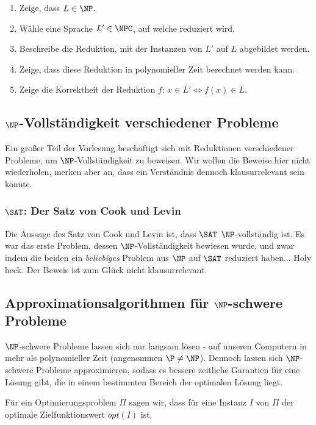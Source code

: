 \documentclass[a4paper,parskip=half*,DIV=7,fontsize=11pt]{scrartcl}
\begin{document}
\begin{enumerate}
\item Zeige, dass $L \in \NP$.
\item Wähle eine Sprache $L' \in \NPC$, auf welche reduziert wird.
\item Beschreibe die Reduktion, mit der Instanzen von $L'$ auf $L$ abgebildet werden.
\item Zeige, dass diese Reduktion in polynomieller Zeit berechnet werden kann.
\item Zeige die Korrektheit der Reduktion $f$: $x \in L' \iff f(x) \in L$.
\end{enumerate}

\subsection[NP-Vollständigkeit verschiedener Probleme]{$\NP$-Vollständigkeit verschiedener Probleme}

Ein großer Teil der Vorlesung beschäftigt sich mit Reduktionen verschiedener Probleme, um $\NP$-Vollständigkeit zu beweisen. Wir wollen die Beweise hier nicht wiederholen, merken aber an, dass ein Verständnis dennoch klausurrelevant sein könnte.

\subsubsection[SAT: Der Satz von Cook und Levin]{$\SAT$: Der Satz von Cook und Levin}
Die Aussage des Satz von Cook und Levin ist, dass $\SAT$ $\NP$-vollständig ist. Es war das erste Problem, dessen $\NP$-Vollständigkeit bewiesen wurde, und zwar indem die beiden ein \textit{beliebiges} Problem aus $\NP$ auf $\SAT$ reduziert haben... Holy heck. Der Beweis ist zum Glück nicht klausurrelevant.

\subsection[Approximationsalgorithmen für NP-schwere Probleme]{Approximationsalgorithmen für $\NP$-schwere Probleme}
$\NP$-schwere Probleme lassen sich nur langsam lösen - auf unseren Computern in mehr als polynomieller Zeit (angenommen $\P \neq \NP$). Dennoch lassen sich $\NP$-schwere Probleme approximieren, sodass es bessere zeitliche Garantien für eine Lösung gibt, die in einem bestimmten Bereich der optimalen Lösung liegt.

Für ein Optimierungsproblem $\Pi$ sagen wir, dass für eine Instanz $I$ von $\Pi$ der optimale Zielfunktionswert $opt(I)$ ist.
\end{document}

